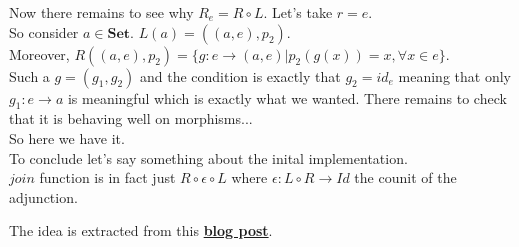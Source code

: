 \documentclass[a4paper,12pt]{article}
\begin{document}
Now there remains to see why $R_e=R \circ L$. Let's take $r=e$.\\ So consider $a \in \textbf{Set}$. $L(a)=((a,e),p_2)$.\\
Moreover, $R((a,e),p_2)=\{g:e \to (a,e) | p_2(g(x))=x, \forall x \in e\}$.\\ Such a $g=(g_1,g_2)$ and the condition is exactly that $g_2 = id_e$ meaning that only $g_1:e \to a$ is meaningful which is exactly what we wanted. There remains to check that it is behaving well on morphisms...\\
So here we have it.\\
To conclude let's say something about the inital implementation.\\
$join$ function is in fact just $R\circ \epsilon \circ L$ where $\epsilon: L\circ R \to Id$ the counit of the adjunction.






\noindent The idea is extracted from this \href{http://blog.higher-order.com/blog/2015/09/30/the-adjunction-that-induces-the-reader-monad/}{\textbf{blog post}}.
\end{document}
